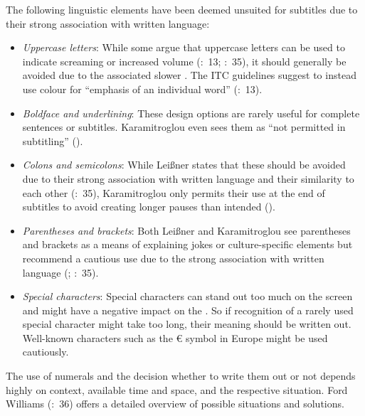 The following linguistic elements have been deemed unsuited for subtitles due to their strong association with written language:

\begin{itemize}
\item \textit{Uppercase letters}: While some argue that uppercase letters can be used to indicate screaming or increased volume (\citealt{Itc1999}:~13; \citealt{Leisner2009}:~35), it should generally be avoided due to the associated slower . The ITC guidelines suggest to instead use colour for “emphasis of an individual word” (\citeyear{Itc1999}:~13).
\item \textit{Boldface and underlining}: These design options are rarely useful for complete sentences or subtitles. Karamitroglou even sees them as “not permitted in subtitling” (\citeyear{Karamitroglou1998}).
\item \textit{Colons and semicolons}: While Leißner states that these should be avoided due to their strong association with written language and their similarity to each other (\citeyear{Leisner2009}:~35), Karamitroglou only permits their use at the end of subtitles to avoid creating longer pauses than intended (\citeyear{Karamitroglou1998}).
\item \textit{Parentheses and brackets}: Both Leißner and Karamitroglou see parentheses and brackets as a means of explaining jokes or culture-specific elements but recommend a cautious use due to the strong association with written language (\citealt{Karamitroglou1998}; \citealt{Leisner2009}:~35).
\item \textit{Special characters}: Special characters can stand out too much on the screen and might have a negative impact on the . So if recognition of a rarely used special character might take too long, their meaning should be written out. Well-known characters such as the
{\euro}
symbol in Europe might be used cautiously.
\end{itemize}

The use of numerals and the decision whether to write them out or not depends highly on context, available time and space, and the respective situation. Ford Williams (\citeyear{Ford_williams2009}:~36) offers a detailed overview of possible situations and solutions.

